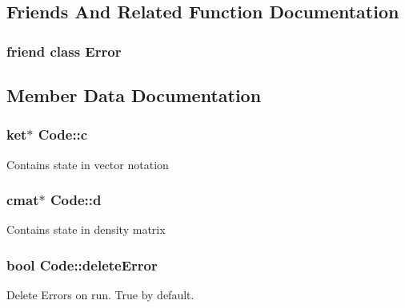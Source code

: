 \subsection{Friends And Related Function Documentation}
\subsubsection[{\texorpdfstring{Error}{Error}}]{\setlength{\rightskip}{0pt plus 5cm}friend class {\bf Error}\hspace{0.3cm}{\ttfamily [friend]}}\hypertarget{class_code_a16d3937baa3679c525821223427be40b}{}\label{class_code_a16d3937baa3679c525821223427be40b}


\subsection{Member Data Documentation}
\subsubsection[{\texorpdfstring{c}{c}}]{\setlength{\rightskip}{0pt plus 5cm}ket$\ast$ Code\+::c\hspace{0.3cm}{\ttfamily [protected]}}\hypertarget{class_code_a01a6ba9da79914bc6980ffddf53ecb24}{}\label{class_code_a01a6ba9da79914bc6980ffddf53ecb24}
Contains state in vector notation 
\subsubsection[{\texorpdfstring{d}{d}}]{\setlength{\rightskip}{0pt plus 5cm}cmat$\ast$ Code\+::d\hspace{0.3cm}{\ttfamily [protected]}}\hypertarget{class_code_a92025265fbd17156f2a3dc7a6e5364f6}{}\label{class_code_a92025265fbd17156f2a3dc7a6e5364f6}
Contains state in density matrix 
\subsubsection[{\texorpdfstring{delete\+Error}{deleteError}}]{\setlength{\rightskip}{0pt plus 5cm}bool Code\+::delete\+Error\hspace{0.3cm}{\ttfamily [protected]}}\hypertarget{class_code_ae448fe74faf959e28ae7a17d13dd4790}{}\label{class_code_ae448fe74faf959e28ae7a17d13dd4790}
Delete Errors on run. True by default. 

